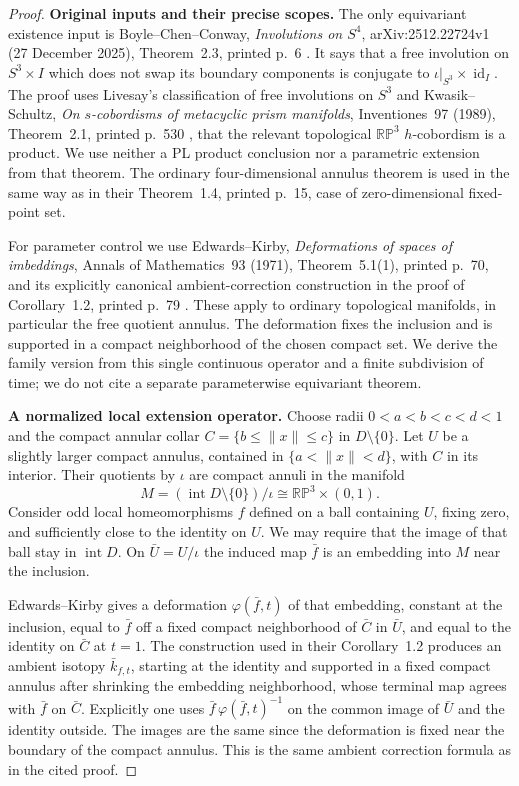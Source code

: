\begin{proof}
\textbf{Original inputs and their precise scopes.}\quad
The only equivariant existence input is Boyle--Chen--Conway,
\emph{Involutions on $S^4$}, arXiv:2512.22724v1 (27 December 2025),
Theorem~2.3, printed p.~6 \cite{BoyleChenConway2025}. It says that a free involution on $S^3\times I$
which does not swap its boundary components is conjugate to
$\iota|_{S^3}\times\operatorname{id}_I$. The proof uses Livesay's
classification of free involutions on $S^3$ and Kwasik--Schultz,
\emph{On $s$-cobordisms of metacyclic prism manifolds}, Inventiones~97
(1989), Theorem~2.1, printed p.~530 \cite{KwasikSchultz1989}, that the relevant topological
$\mathbb {RP}^3$ $h$-cobordism is a product. We use neither a PL product
conclusion nor a parametric extension from that theorem. The ordinary
four-dimensional annulus theorem is used in the same way as in their
Theorem~1.4, printed p.~15, case of zero-dimensional fixed-point set.

For parameter control we use Edwards--Kirby, \emph{Deformations of spaces
of imbeddings}, Annals of Mathematics~93 (1971), Theorem~5.1(1), printed
p.~70, and its explicitly canonical ambient-correction construction in the
proof of Corollary~1.2, printed p.~79 \cite{EdwardsKirby1971}. These apply to ordinary topological
manifolds, in particular the free quotient annulus. The deformation fixes
the inclusion and is supported in a compact neighborhood of the chosen
compact set. We derive the family version from this single continuous
operator and a finite subdivision of time; we do not cite a separate
parameterwise equivariant theorem.

\textbf{A normalized local extension operator.}\quad
Choose radii $0<a<b<c<d<1$ and the compact annular collar
$C=\{b\le\|x\|\le c\}$ in $D\setminus\{0\}$. Let $U$ be a slightly
larger compact annulus, contained in $\{a<\|x\|<d\}$, with $C$ in its
interior. Their quotients by $\iota$ are compact annuli in the manifold
\[
 M=(\operatorname{int}D\setminus\{0\})/\iota
       \cong\mathbb {RP}^3\times(0,1).
\]
Consider odd local homeomorphisms $f$ defined on a ball containing $U$,
fixing zero, and sufficiently close to the identity on $U$. We may require
that the image of that ball stay in $\operatorname{int}D$. On $\bar U=U/\iota$
the induced map $\bar f$ is an embedding into $M$ near the inclusion.

Edwards--Kirby gives a deformation $\varphi(\bar f,t)$ of that embedding,
constant at the inclusion, equal to $\bar f$ off a fixed compact
neighborhood of $\bar C$ in $\bar U$, and equal to the identity on
$\bar C$ at $t=1$. The construction used in their Corollary~1.2 produces
an ambient isotopy $\bar k_{f,t}$, starting at the identity and supported
in a fixed compact annulus after shrinking the embedding neighborhood,
whose terminal map agrees with $\bar f$ on $\bar C$.
Explicitly one uses
$\bar f\,\varphi(\bar f,t)^{-1}$ on the common image of $\bar U$ and the
identity outside. The images are the same since the deformation is fixed
near the boundary of the compact annulus. This is the same ambient
correction formula as in the cited proof.


\end{proof}
